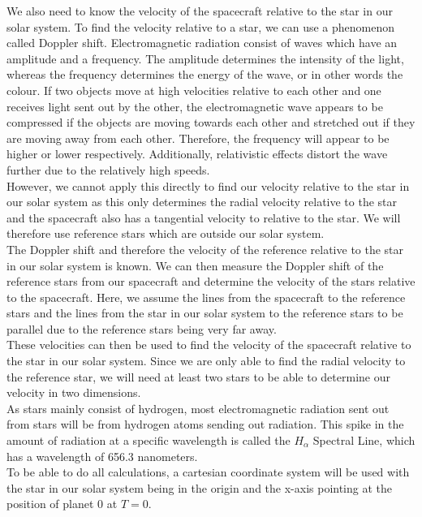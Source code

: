\documentclass[reprint,english,notitlepage]{revtex4-2}
\begin{document}
We also need to know the velocity of the spacecraft relative to the star in our solar system.
To find the velocity relative to a star, we can use a phenomenon called Doppler shift.
Electromagnetic radiation consist of waves which have an amplitude and a frequency.
The amplitude determines the intensity of the light, whereas the frequency determines the energy of the wave, or in other words the colour.
If two objects move at high velocities relative to each other and one receives light sent out by the other, the electromagnetic wave appears to be compressed if the objects are moving towards each other and stretched out if they are moving away from each other.
Therefore, the frequency will appear to be higher or lower respectively.
Additionally, relativistic effects distort the wave further due to the relatively high speeds.\\
However, we cannot apply this directly to find our velocity relative to the star in our solar system as this only determines the radial velocity relative to the star and the spacecraft also has a tangential velocity to relative to the star.
We will therefore use reference stars which are outside our solar system.\\
The Doppler shift and therefore the velocity of the reference relative to the star in our solar system is known.
We can then measure the Doppler shift of the reference stars from our spacecraft and determine the velocity of the stars relative to the spacecraft.
Here, we assume the lines from the spacecraft to the reference stars and the lines from the star in our solar system to the reference stars to be parallel due to the reference stars being very far away.\\
These velocities can then be used to find the velocity of the spacecraft relative to the star in our solar system.
Since we are only able to find the radial velocity to the reference star, we will need at least two stars to be able to determine our velocity in two dimensions.\\
As stars mainly consist of hydrogen, most electromagnetic radiation sent out from stars will be from hydrogen atoms sending out radiation.
This spike in the amount of radiation at a specific wavelength is called the $H_{\alpha}$ Spectral Line, which has a wavelength of 656.3 nanometers.\\
To be able to do all calculations, a cartesian coordinate system will be used with the star in our solar system being in the origin and the x-axis pointing at the position of planet 0 at $T = 0$.
\end{document}

